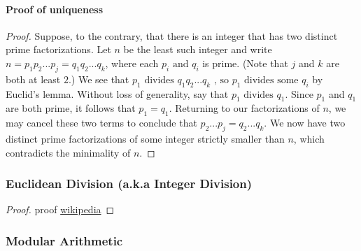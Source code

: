 \documentclass[../MathsNotesBase.tex]{subfiles}
\begin{document}
{		\paragraph{Proof of uniqueness}
		\begin{proof}
			Suppose, to the contrary, that there is an integer that has two distinct prime factorizations. Let $ n $ be the least such integer and write $ n = p_1 p_2 ... p_j = q_1 q_2 ... q_k $, where each $ p_i \text{ and } q_i $ is prime. (Note that $ j $ and $ k $ are both at least $ 2 $.) We see that $ p_1 \text{ divides } q_1 q_2 ... q_k\text{ , so } p_1\text{  divides some } q_i $ by Euclid's lemma. Without loss of generality, say that $ p_1 \text{ divides } q_1 $. Since $ p_1 $ and $ q_1 $ are both prime, it follows that $ p_1 = q_1 $. Returning to our factorizations of $ n $, we may cancel these two terms to conclude that $ p_2 ... p_j = q_2 ... q_k $. We now have two distinct prime factorizations of some integer strictly smaller than $ n $, which contradicts the minimality of $ n $.
		\end{proof}
	
		
		\biggerskip
		\subsubsection{Euclidean Division (a.k.a Integer Division)}
		\begin{proof}
			proof \href{https://en.wikipedia.org/wiki/Euclidean_division#Proof}{wikipedia}
		\end{proof}
		
		
		\pagebreak
		\subsubsection{Modular Arithmetic}\bigskip
		
}
\end{document}
